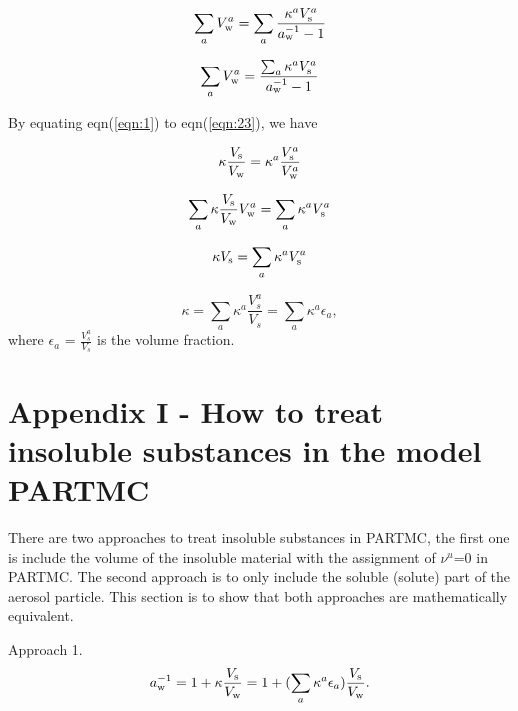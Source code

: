 \documentclass[12pt]{article}
\begin{document}
\begin{equation}
\sum_{a}V_{\rm w}^{a}  =\sum_{a}\frac{\kappa^{a} V_{\rm s}^{a}}{a_{\rm w}^{-1}-1}
\end{equation}

\begin{equation}
\sum_{a}V_{\rm w}^{a}  =\frac{\sum_{a}\kappa^{a} V_{\rm s}^{a}}{a_{\rm w}^{-1}-1}
\end{equation}




By equating eqn(\ref{eqn:1}) to eqn(\ref{eqn:23}), we have

\begin{equation}\label{eqn:28}
\kappa \frac{V_{\rm s}}{V_{\rm w}}= \kappa^{a} \frac{V_{\rm s}^{a}}{V_{\rm w}^{a}}
\end{equation}

\begin{equation}\label{eqn:29}
\sum_{a} \kappa \frac{V_{\rm s}}{V_{\rm w}} V_{\rm w}^{a}= \sum_{a} \kappa^{a} V_{\rm s}^{a}
\end{equation}

\begin{equation}\label{eqn:30}
\kappa V_{\rm s}= \sum_{a} \kappa^{a} V_{\rm s}^{a}
\end{equation}

\begin{equation}\label{eqn:31}
\kappa= \sum_{a} \kappa^{a} \frac {V_{s}^{a}}{V_{s}} = \sum_{a} \kappa^{a} \epsilon_{a},
\end{equation}
where $\epsilon_{a}$ = $ \frac{V_{s}^{a}}{V_{s}}$ is the volume fraction.


\section{Appendix I - How to treat insoluble substances in the model PARTMC}

There are two approaches to treat insoluble substances in PARTMC, the first one is include the volume of the insoluble material with the assignment of $\nu^{u}$=$0$ in PARTMC. The second approach is to only include the soluble (solute) part of the aerosol particle. This section is to show that both approaches are mathematically equivalent.
 
Approach 1. 
\begin{equation}\label{eqn:32}
a_{\rm w}^{-1}=1+\kappa \frac{V_{\rm s}}{V_{\rm w}}=1+ (\sum_{a} \kappa^{a} \epsilon_{a})\frac{V_{\rm s}}{V_{\rm w}}.
\end{equation}
\end{document}
